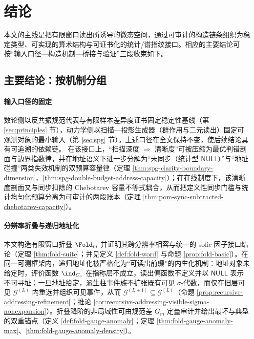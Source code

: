 \section{结论}

本文的主线是把有限窗口读出所诱导的微态空间，通过可审计的构造链条组织为稳定类型、可实现的算术结构与可证书化的统计/谱指纹接口。相应的主要结论可按“输入口径—构造机制—桥接与验证”三段收束如下。

\subsection{主要结论：按机制分组}\label{subsec:core-conclusions}
\paragraph{输入口径的固定}
数论侧以反共振规范代表与有限样本差异度证书固定稳定性基线（第 \ref{sec:principles} 节），动力学侧以扫描—投影生成器（群作用与二元读出）固定可观测对象的最小输入（第 \ref{sec:spg} 节）。上述口径在全文保持不变，使后续结论具有可追溯的依赖链。
在该接口上，“扫描深度 \(\Rightarrow\) 清晰度”可被压缩为最优判错剖面与边界指数律，并在地址语义下进一步分解为“未同步（统计型 \(\mathsf{NULL}\)）”与“地址碰撞”两类失效机制的双预算容量律（定理 \ref{thm:spg-clarity-boundary-dimension}、\ref{thm:spg-double-budget-address-capacity}）；在在线制度下，该清晰度剖面又与同步扣除的 Chebotarev 容量不等式耦合，从而把定义性同步门槛与统计均匀化预算分离为可审计的两段账本（定理 \ref{thm:pom-sync-subtracted-chebotarev-capacity}）。

\paragraph{分辨率折叠与递归地址化}
本文构造有限窗口折叠 \(\Fold_m\) 并证明其跨分辨率相容与统一的 sofic 因子接口结论（定理 \ref{thm:fold-suite}；并见定义 \ref{def:fold-word} 与命题 \ref{prop:fold-basic}）。在同一可测框架内，递归地址化被严格化为“可读出前缀”的内生化机制：地址对象未给定时，评价函数 \(\ind_{C_a}\) 在指称层不成立，读出偏函数不定义并以 \(\mathsf{NULL}\) 表示不可寻址；一旦地址给定，派生柱事件族不扩张既有可见 \(\sigma\)-代数，而仅在旧层可见 \(\mathcal{G}^{(L)}\) 内重选并组织可见事件，从而 \(\mathcal{G}^{(L+1)}\subseteq \mathcal{G}^{(L)}\)（命题 \ref{prop:recursive-addressing-refinement}；推论 \ref{cor:recursive-addressing-visible-sigma-nonexpansion}）。折叠降阶的非局域性可由规范差 \(G_m\) 定量审计并给出最坏与典型的双重锚点（定义 \ref{def:fold-gauge-anomaly}；定理 \ref{thm:fold-gauge-anomaly-max}、\ref{thm:fold-gauge-anomaly-density}）。

